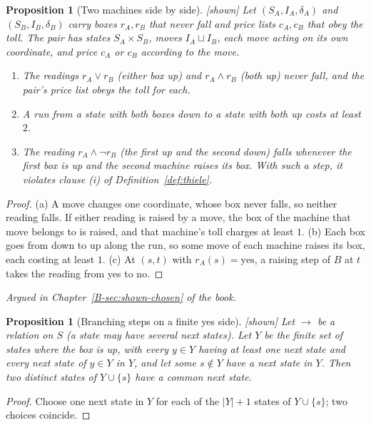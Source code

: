 \documentclass[11pt, a4paper]{article}
\theoremstyle{plain}
\newtheorem{proposition}[theorem]{Proposition}
\theoremstyle{definition}
\theoremstyle{remark}
\newcommand{\step}{\delta}
\newcommand{\cost}{c}
\newcommand{\rd}{r}
\newcommand{\argued}[1]{\par\noindent\textit{Argued in Chapter~\ref{B-#1} of the book.}\par}
\newcommand{\kind}[1]{\textup{[#1]}}
\begin{document}
\begin{proposition}[Two machines side by side]\label{spec:pair} \kind{shown}
Let $(S_A,I_A,\step_A)$ and $(S_B,I_B,\step_B)$ carry boxes $\rd_A,\rd_B$ that never fall and price lists
$\cost_A,\cost_B$ that obey the toll. The pair has states $S_A\times S_B$, moves $I_A\sqcup I_B$, each move
acting on its own coordinate, and price $\cost_A$ or $\cost_B$ according to the move.
\begin{enumerate}[label=(\alph*)]
\item The readings $\rd_A\vee\rd_B$ (either box up) and $\rd_A\wedge\rd_B$ (both up) never fall, and the
pair's price list obeys the toll for each.
\item A run from a state with both boxes down to a state with both up costs at least $2$.
\item The reading $\rd_A\wedge\neg\rd_B$ (the first up and the second down) falls whenever the first box is up
and the second machine raises its box. With such a step, it violates clause (i) of
Definition~\ref{def:thiele}.
\end{enumerate}
\end{proposition}

\begin{proof}
(a) A move changes one coordinate, whose box never falls, so neither reading falls. If either reading is
raised by a move, the box of the machine that move belongs to is raised, and that machine's toll charges at
least $1$. (b) Each box goes from down to up along the run, so some move of each machine raises its box,
each costing at least $1$. (c) At $(s,t)$ with $\rd_A(s)=\mathrm{yes}$, a raising step of $B$ at $t$ takes the
reading from yes to no.
\end{proof}

\argued{sec:shown-chosen}

\begin{proposition}[Branching steps on a finite yes side]\label{spec:branch-choice} \kind{shown}
Let $\to$ be a relation on $S$ (a state may have several next states). Let $Y$ be the finite set of states
where the box is up, with every $y\in Y$ having at least one next state and every next state of $y\in Y$ in
$Y$, and let some $s\notin Y$ have a next state in $Y$. Then two distinct states of $Y\cup\{s\}$ have a common
next state.
\end{proposition}

\begin{proof}
Choose one next state in $Y$ for each of the $|Y|+1$ states of $Y\cup\{s\}$; two choices coincide.
\end{proof}
\end{document}
